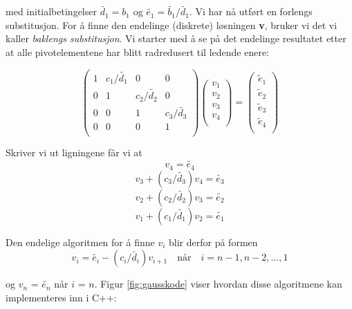 \documentclass{article}
\begin{document}
med initialbetingelser $\tilde{d_1} = b_1$ og $\tilde{e_1} = \tilde{b_1}/\tilde{d_1}$. Vi har nå utført en forlengs substitusjon. For å finne den endelinge (diskrete) løsningen \textbf{v}, bruker vi det vi kaller \textit{baklengs substitusjon}. Vi starter med å se på det endelinge resultatet etter at alle pivotelementene har blitt radredusert til ledende enere:

\begin{equation}
    \left(\begin{array}{cccccc}
                           1 & c_1/\tilde{d_1} & 0 &0 \\
                           0 & 1 & c_2/\tilde{d_2} &0 \\
                           0 & 0 & 1 & c_3/\tilde{d_3} \\
                           0 & 0 & 0 &  1  \\
                      \end{array} \right)\left(\begin{array}{c}
                           v_1\\
                           v_2\\
                           v_3\\
                          v_4  \\
                      \end{array} \right)
  =\left(\begin{array}{c}
                           \tilde{e}_1\\
                           \tilde{e}_2\\
                        \tilde{e}_3\\
                        \tilde{e}_4\\
                      \end{array} \right)
\end{equation}

Skriver vi ut ligningene får vi at
\[v_4 = \tilde{e_4}\]
\[v_3 + (c_3/\tilde{d_3})v_4 = \tilde{e_3} \]
\[v_2 + (c_2/\tilde{d_2})v_3 = \tilde{e_2}\]
\[v_1 + (c_1/\tilde{d_1})v_2 = \tilde{e_1}\]

Den endelige algoritmen for å finne $v_i$ blir derfor på formen
\begin{equation}
v_i = \tilde{e_i}-(c_{i}/\tilde{d_i})v_{i+1} \quad \textrm{når} \quad i = n-1, n-2, ..., 1
\end{equation}

og $v_n$ = $\tilde{e_n}$ når $i$ = $n$. Figur \ref{fig:gausskode} viser hvordan disse algoritmene kan implementeres inn i C++:
\end{document}
